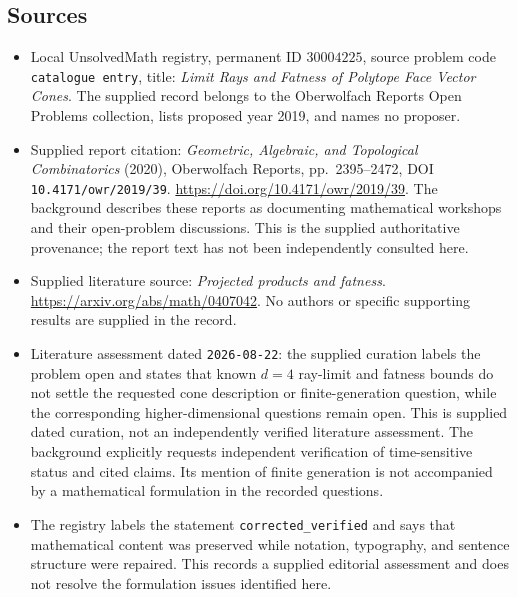\documentclass[11pt]{article}
\begin{document}
\subsection{Sources}
\begin{itemize}
\item Local UnsolvedMath registry, permanent ID \(30004225\), source problem code \texttt{catalogue entry}, title: \emph{Limit Rays and Fatness of Polytope Face Vector Cones}. The supplied record belongs to the Oberwolfach Reports Open Problems collection, lists proposed year 2019, and names no proposer.
\item Supplied report citation: \emph{Geometric, Algebraic, and Topological Combinatorics} (2020), Oberwolfach Reports, pp.~2395--2472, DOI \texttt{10.4171/owr/2019/39}. \url{https://doi.org/10.4171/owr/2019/39}. The background describes these reports as documenting mathematical workshops and their open-problem discussions. This is the supplied authoritative provenance; the report text has not been independently consulted here.
\item Supplied literature source: \emph{Projected products and fatness}. \url{https://arxiv.org/abs/math/0407042}. No authors or specific supporting results are supplied in the record.
\item Literature assessment dated \texttt{2026-08-22}: the supplied curation labels the problem open and states that known \(d=4\) ray-limit and fatness bounds do not settle the requested cone description or finite-generation question, while the corresponding higher-dimensional questions remain open. This is supplied dated curation, not an independently verified literature assessment. The background explicitly requests independent verification of time-sensitive status and cited claims. Its mention of finite generation is not accompanied by a mathematical formulation in the recorded questions.
\item The registry labels the statement \texttt{corrected\_verified} and says that mathematical content was preserved while notation, typography, and sentence structure were repaired. This records a supplied editorial assessment and does not resolve the formulation issues identified here.
\end{itemize}
\end{document}

